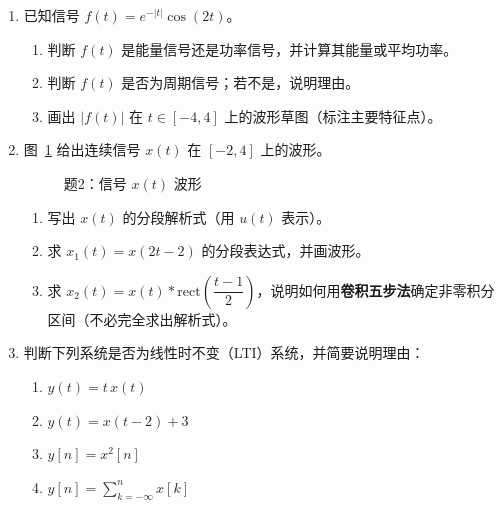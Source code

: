 \documentclass[11pt,a4paper]{ctexart}
\newcommand{\rect}{\mathrm{rect}}
\begin{document}
\begin{enumerate}[label=\textbf{题\arabic*.},leftmargin=*,itemsep=1.2em]

\item \label{q:1}
已知信号 $f(t) = e^{-|t|}\cos(2t)$。
\begin{enumerate}[label=(\alph*)]
    \item 判断 $f(t)$ 是能量信号还是功率信号，并计算其能量或平均功率。
    \item 判断 $f(t)$ 是否为周期信号；若不是，说明理由。
    \item 画出 $|f(t)|$ 在 $t\in[-4,4]$ 上的波形草图（标注主要特征点）。
\end{enumerate}

\item \label{q:2}
图~\ref{fig:q2-wave} 给出连续信号 $x(t)$ 在 $[-2,4]$ 上的波形。
\begin{figure}[htbp]
\centering
{}
\caption{题2：信号 $x(t)$ 波形}
\label{fig:q2-wave}
\end{figure}
\begin{enumerate}[label=(\alph*)]
    \item 写出 $x(t)$ 的分段解析式（用 $u(t)$ 表示）。
    \item 求 $x_1(t)=x(2t-2)$ 的分段表达式，并画波形。
    \item 求 $x_2(t)=x(t)*\rect\!\left(\dfrac{t-1}{2}\right)$，说明如何用\textbf{卷积五步法}确定非零积分区间（不必完全求出解析式）。
\end{enumerate}

\item \label{q:3}
判断下列系统是否为线性时不变（LTI）系统，并简要说明理由：
\begin{enumerate}[label=(\alph*)]
    \item $y(t) = t\,x(t)$
    \item $y(t) = x(t-2) + 3$
    \item $y[n] = x^2[n]$
    \item $y[n] = \sum_{k=-\infty}^{n} x[k]$
\end{enumerate}

\end{enumerate}
\end{document}
